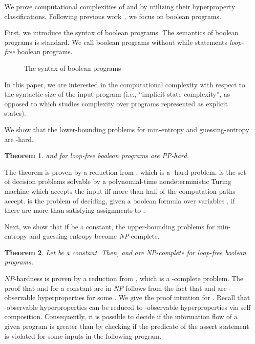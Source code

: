 \documentclass[]{eptcs}
\newtheorem{theorem}{Theorem}[section]
\newcommand{\addappendix}[2]{#2}
\begin{document}
We prove computational complexities of  and
 by utilizing their hyperproperty
classifications.  Following previous
work~\cite{DBLP:conf/csfw/YasuokaT10,DBLP:conf/esorics/YasuokaT10,DBLP:conf/csfw/CernyCH11},
we focus on boolean programs.

First, we introduce the syntax of boolean programs.  \addappendix{The
  semantics of boolean programs is standard and is deferred to
  Appendix (Figure~\ref{fig:semantics}).}{The semantics of boolean
  programs is standard.}  We call boolean programs without {\sf while}
statements {\em loop-free} boolean programs.
\begin{figure}[h]

\caption{The syntax of boolean programs}
\label{fig:syntax}
\end{figure}

In this paper, we are interested in the computational complexity with
respect to the syntactic size of the input program (i.e., ``implicit
state complexity'', as opposed to \cite{DBLP:conf/csfw/CernyCH11}
which studies complexity over programs represented as explicit
states).

We show that the lower-bounding problems for min-entropy and
guessing-entropy are -hard.
\begin{theorem}
\label{thm:lmelgepp}
 and  for loop-free
boolean programs are {\it PP}-hard.
\end{theorem}
The theorem is proven by a reduction from , which is
a -hard problem.   is the set of decision problems
solvable by a polynomial-time nondeterministic Turing machine which
accepts the input iff more than half of the computation paths accept.
{} is the problem of deciding, given a boolean formula
 over variables , if there are more than
 satisfying assignments to .

Next, we show that if  be a constant, the upper-bounding problems
for min-entropy and guessing-entropy become {\it NP}-complete.
\begin{theorem}
\label{thm:lmelgenp}
  Let  be a constant.  Then,  and
   are {\it NP}-complete for loop-free boolean
  programs.
\end{theorem} 
{\it NP}-hardness is proven by a reduction from , which
is a -complete problem.  The proof that  and  for a constant  are in {\it NP}
follows from the fact that  and
 are -observable hyperproperties for some
.  We give the proof intuition for .  Recall
that -observable hyperproperties can be reduced to -observable
hyperproperties via self composition.  Consequently, it is possible to
decide if the information flow of a given program  is greater than
 by checking if the predicate of the {\sf assert} statement is
violated for some inputs in the following program.
\end{document}
